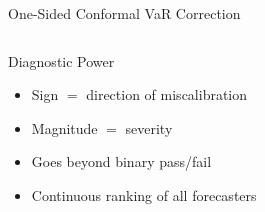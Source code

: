 \documentclass[9pt, aspectratio=169, t]{beamer}
\begin{document}
\begin{frame}{One-Sided Conformal VaR Correction}
{\begin{columns}[T]
		\begin{block}{Diagnostic Power}
		\begin{itemize}\setlength{\itemsep}{0pt}
			\item Sign $=$ direction of miscalibration
			\item Magnitude $=$ severity
			\item Goes beyond binary pass/fail
			\item Continuous ranking of all forecasters
		\end{itemize}
		\end{block}
	\end{columns}
	}
\end{frame}

\end{document}
